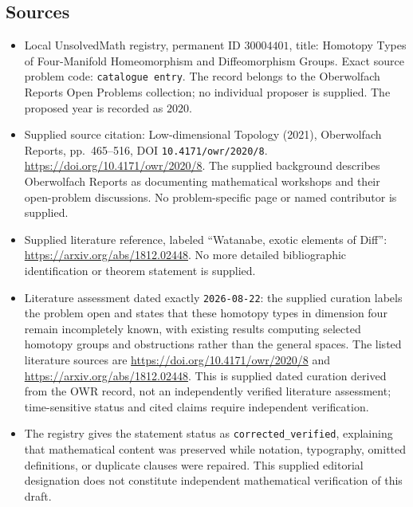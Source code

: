 \documentclass[11pt]{article}
\begin{document}
\subsection{Sources}
\begin{itemize}
\item Local UnsolvedMath registry, permanent ID \(30004401\), title: Homotopy Types of Four-Manifold Homeomorphism and Diffeomorphism Groups. Exact source problem code: \texttt{catalogue entry}. The record belongs to the Oberwolfach Reports Open Problems collection; no individual proposer is supplied. The proposed year is recorded as \(2020\).
\item Supplied source citation: Low-dimensional Topology (2021), Oberwolfach Reports, pp.\ 465--516, DOI \texttt{10.4171/owr/2020/8}. \url{https://doi.org/10.4171/owr/2020/8}. The supplied background describes Oberwolfach Reports as documenting mathematical workshops and their open-problem discussions. No problem-specific page or named contributor is supplied.
\item Supplied literature reference, labeled ``Watanabe, exotic elements of Diff'': \url{https://arxiv.org/abs/1812.02448}. No more detailed bibliographic identification or theorem statement is supplied.
\item Literature assessment dated exactly \texttt{2026-08-22}: the supplied curation labels the problem open and states that these homotopy types in dimension four remain incompletely known, with existing results computing selected homotopy groups and obstructions rather than the general spaces. The listed literature sources are \url{https://doi.org/10.4171/owr/2020/8} and \url{https://arxiv.org/abs/1812.02448}. This is supplied dated curation derived from the OWR record, not an independently verified literature assessment; time-sensitive status and cited claims require independent verification.
\item The registry gives the statement status as \texttt{corrected\_verified}, explaining that mathematical content was preserved while notation, typography, omitted definitions, or duplicate clauses were repaired. This supplied editorial designation does not constitute independent mathematical verification of this draft.
\end{itemize}
\end{document}
